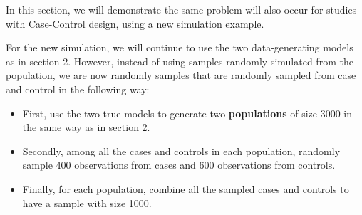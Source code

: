 \documentclass[
]{article}
\providecommand{\tightlist}{%
  \setlength{\itemsep}{0pt}\setlength{\parskip}{0pt}}
\begin{document}
In this section, we will demonstrate the same problem will also occur
for studies with Case-Control design, using a new simulation example.

For the new simulation, we will continue to use the two data-generating
models as in section 2. However, instead of using samples randomly
simulated from the population, we are now randomly samples that are
randomly sampled from case and control in the following way:

\begin{itemize}
\tightlist
\item
  First, use the two true models to generate two \textbf{populations} of
  size 3000 in the same way as in section 2.
\item
  Secondly, among all the cases and controls in each population,
  randomly sample 400 observations from cases and 600 observations from
  controls.
\item
  Finally, for each population, combine all the sampled cases and
  controls to have a sample with size 1000.
\end{itemize}
\end{document}
